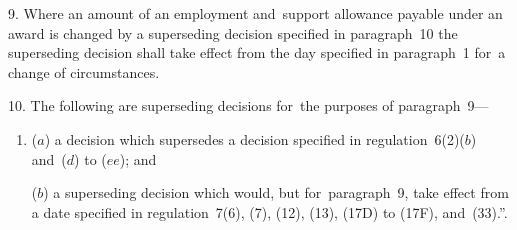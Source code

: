 \documentclass[12pt,a4paper]{article}
\begin{document}
\medskip

9.  Where an amount of an employment and~support allowance payable under an award is changed by a superseding decision specified in paragraph~10 the superseding decision shall take effect from the day specified in paragraph~1 for~a change of circumstances.

\medskip

10.  The following are superseding decisions for~the purposes of paragraph~9—
\begin{enumerate}\item[]
($a$) a decision which supersedes a decision specified in regulation~6(2)($b$)  and~($d$)  to ($ee$); and

\begin{sloppypar}
($b$) a superseding decision which would, but for~paragraph~9, take effect from a date specified in regulation~7(6), (7), (12), (13), (17D) to (17F), and~(33).”.
\end{sloppypar}
\end{enumerate}
\end{document}
